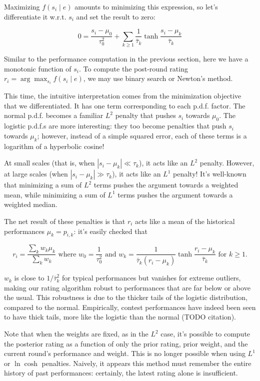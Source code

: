 \documentclass{article}
\begin{document}
Maximizing $f(s_i\mid e)$ amounts to minimizing this expression, so let's differentiate it w.r.t. $s_i$ and set the result to zero:

\[
0 = \frac{s_i-\mu_0}{\tau_0^2} + \sum_{k\ge 1} \frac{1}{\bar\tau_k} \tanh \frac {s_i-\mu_k} {\bar\tau_k}
\]

Similar to the performance computation in the previous section, here we have a monotonic function of $s_i$. To compute the post-round rating $r_i = \arg\max_{s_i} f(s_i \mid e)$, we may use binary search or Newton's method.

This time, the intuitive interpretation comes from the minimization objective that we differentiated. It has one term corresponding to each p.d.f. factor. The normal p.d.f. becomes a familiar $L^2$ penalty that pushes $s_i$ towards $\mu_0$. The logistic p.d.f.s are more interesting: they too become penalties that push $s_i$ towards $\mu_k$; however, instead of a simple squared error, each of these terms is a logarithm of a hyperbolic cosine!

At small scales (that is, when $|s_i-\mu_k| \ll \tau_k$), it acts like an $L^2$ penalty. However, at large scales (when $|s_i-\mu_k| \gg \tau_k$), it acts like an $L^1$ penalty! It's well-known that minimizing a sum of $L^2$ terms pushes the argument towards a weighted mean, while minimizing a sum of $L^1$ terms pushes the argument towards a weighted median.

The net result of these penalties is that $r_i$ acts like a mean of the historical performances $\mu_k = p_{i,k}$: it's easily checked that

\[r_i = \frac{\sum_k w_k\mu_k}{\sum_k w_k} \text{ where } w_0 = \frac{1}{\tau_0^2} \text{ and }
w_k = \frac{1}{\bar\tau_k(r_i-\mu_k)}\tanh\frac{r_i-\mu_k}{\bar\tau_k} \text{ for }k\ge 1.\]

$w_k$ is close to $1/\bar\tau_k^2$ for typical performances but vanishes for extreme outliers, making our rating algorithm robust to performances that are far below or above the usual. This robustness is due to the thicker tails of the logistic distribution, compared to the normal. Empirically, contest performances have indeed been seen to have thick tails, more like the logistic than the normal (TODO citation).

Note that when the weights are fixed, as in the $L^2$ case, it's possible to compute the posterior rating as a function of only the prior rating, prior weight, and the current round's performance and weight. This is no longer possible when using $L^1$ or $\ln\cosh$ penalties. Naively, it appears this method must remember the entire history of past performances: certainly, the latest rating alone is insufficient.
\end{document}
